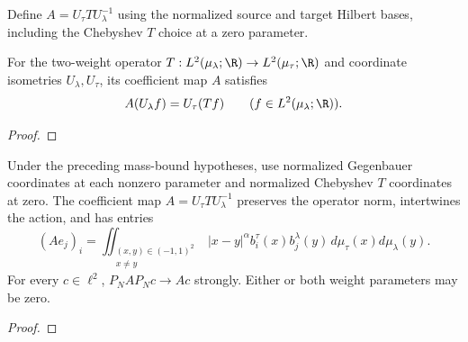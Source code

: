 
\begin{supporting}
\begin{definition}
\label{def:power-law-two-weight-coefficients}
\leanok
Define $A=U_\tau T U_\lambda^{-1}$ using the normalized source and target
Hilbert bases, including the Chebyshev $T$ choice at a zero parameter.
\end{definition}
\begin{theorem}
\label{thm:power-law-two-weight-coefficient-characterisation}
\leanok
For the two-weight operator $T:L^2(\mu_\lambda;\R)\to L^2(\mu_\tau;\R)$
and coordinate isometries $U_\lambda,U_\tau$, its coefficient map $A$ satisfies
\[
 A(U_\lambda f)=U_\tau(Tf)\qquad(f\in L^2(\mu_\lambda;\R)).
\]
\end{theorem}
\begin{proof}
\leanok
\end{proof}

\begin{theorem}
\label{thm:power-law-two-weight-coefficients}
\leanok
Under the preceding mass-bound hypotheses, use normalized Gegenbauer coordinates
at each nonzero parameter and normalized Chebyshev $T$ coordinates at zero.
The coefficient map $A=U_\tau T U_\lambda^{-1}$ preserves the operator norm,
intertwines the action, and has entries
\[
 (Ae_j)_i=\iint_{\substack{(x,y)\in(-1,1)^2\\x\ne y}} |x-y|^\alpha b_i^\tau(x)b_j^\lambda(y)\,
 d\mu_\tau(x)d\mu_\lambda(y).
\]
For every $c\in\ell^2$, $P_NAP_Nc\to Ac$ strongly. Either or both weight
parameters may be zero.
\end{theorem}
\begin{proof}
\leanok
\end{proof}

\end{supporting}


